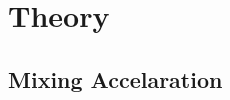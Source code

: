 \documentclass[10pt]{article}
\newcommand{\xbeta}{ x_i \beta}
\newcommand{\be}{\begin{equs}}
\newcommand{\ee}{\end{equs}}
\DeclareMathOperator{\No}{No}
\DeclareMathOperator{\PG}{PG}
\begin{document}
%
%
%
%
%
%
% 
\section{Theory}

\subsection{Mixing Accelaration}
\end{document}
